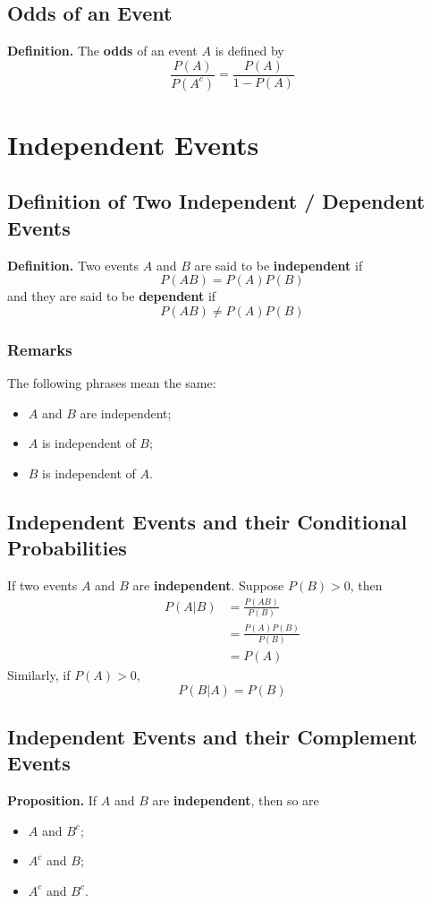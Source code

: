 \documentclass[../st2131_notes.tex]{subfiles}
\begin{document}
\subsection{Odds of an Event}
\textbf{Definition.} The \textbf{odds} of an event \(A\) is defined by
\[\frac{P(A)}{P(A^c)}=\frac{P(A)}{1-P(A)}\]

\section{Independent Events}

\subsection{Definition of Two Independent / Dependent Events}
\textbf{Definition.} Two events \(A\) and \(B\) are said to be \textbf{independent} if
\[P(AB)=P(A)P(B)\]
and they are said to be \textbf{dependent} if
\[P(AB)\ne P(A)P(B)\]

\subsubsection{Remarks}
The following phrases mean the same:
\begin{itemize}
	\item\(A\) and \(B\) are independent;
	\item\(A\) is independent of \(B\);
	\item\(B\) is independent of \(A\).
\end{itemize}

\subsection{Independent Events and their Conditional Probabilities}
If two events \(A\) and \(B\) are \textbf{independent}. Suppose \(P(B)>0\), then
\begin{align*}
	P(A\vert B)&=\frac{P(AB)}{P(B)} \\
	&=\frac{P(A)P(B)}{P(B)} \\
	&=P(A)
\end{align*}
Similarly, if \(P(A)>0\),
\[P(B\vert A)=P(B)\]

\subsection{Independent Events and their Complement Events}
\textbf{Proposition.} If \(A\) and \(B\) are \textbf{independent}, then so are
\begin{itemize}
	\item\(A\) and \(B^c\);
	\item\(A^c\) and \(B\);
	\item\(A^c\) and \(B^c\).
\end{itemize}
\end{document}
